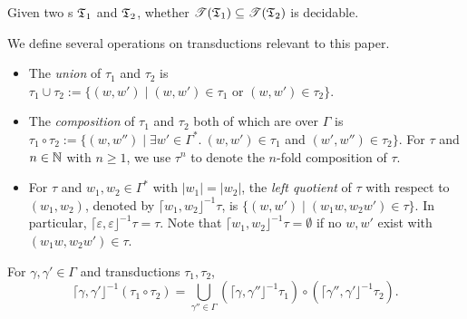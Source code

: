 \begin{proposition}\label{prop-nft-inclusion}
Given two {\NFT}s ${\mathfrak{T} }_1$ and ${\mathfrak{T} }_2$,  whether ${\mathscr{T} }({\mathfrak{T} }_1) \subseteq {\mathscr{T} }({\mathfrak{T} }_2)$ is decidable.
\end{proposition} 

%
We define several operations on transductions relevant to this paper. 
\begin{itemize}
\item The \emph{union} of $\tau_1$ and $\tau_2$ is $\tau_1 \cup \tau_2:=\{(w, w') \mid (w, w') \in \tau_1 \mbox{ or } (w,w') \in \tau_2\}$.
%
%
\item %
The \emph{composition} of $\tau_1$ and $\tau_2$ both of which are over $\Gamma$ is $\tau_1 \circ \tau_2 := \{(w, w'') \mid \exists w' \in \Gamma^*.\ (w,w') \in \tau_1$ and $(w',w'') \in \tau_2\}$. For $\tau$ and $n \in \mathbb{N}$ with $n \ge 1$, we use $\tau^n$ to denote the $n$-fold composition of $\tau$. 
%
\item For  $\tau$ and  $w_1,w_2 \in \Gamma^*$ with $|w_1| = |w_2|$, the \emph{left quotient} of $\tau$ with respect to $(w_1, w_2)$, denoted by $\lceil w_1, w_2 \rfloor^{-1} \tau$, is  $\{(w,w') \mid (w_1w, w_2w') \in \tau\}$. In particular, $\lceil \varepsilon, \varepsilon\rfloor^{-1} \tau =\tau$. Note that  $\lceil w_1, w_2 \rfloor^{-1} \tau = \emptyset$ if no  $w, w'$ exist with $(w_1w, w_2 w') \in \tau$.
%
\end{itemize}

\begin{proposition}
    For   $\gamma,\gamma'\in\Gamma$ and transductions $\tau_1,\tau_2$,
    $$\lceil \gamma,\gamma'\rfloor^{-1}(\tau_1\circ\tau_2) = \bigcup_{\gamma'' \in \Gamma} (\lceil \gamma,\gamma''\rfloor^{-1}\tau_1)\circ(\lceil\gamma'',\gamma'\rfloor^{-1}\tau_2). $$
\end{proposition}

